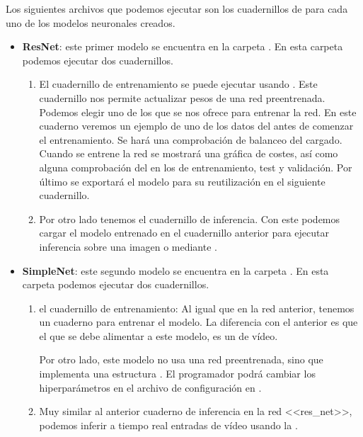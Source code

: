 Los siguientes archivos que podemos ejecutar son los cuadernillos de  para cada uno de los modelos neuronales creados.

\begin{itemize}
  \item \textbf{ResNet}: este primer modelo se encuentra en la carpeta . En esta carpeta podemos ejecutar dos cuadernillos.

        \begin{enumerate}
          \item El cuadernillo de entrenamiento se puede ejecutar usando . Este cuadernillo nos permite actualizar pesos de una red preentrenada. Podemos elegir uno de los  que se nos ofrece para entrenar la red. En este cuaderno veremos un ejemplo de uno de los datos del  antes de comenzar el entrenamiento. Se hará una comprobación de balanceo del  cargado. Cuando se entrene la red se mostrará una gráfica de costes, así como alguna comprobación del  en los  de entrenamiento, test y validación. Por último se exportará el modelo para su reutilización en el siguiente cuadernillo.

          \item Por otro lado tenemos el cuadernillo de inferencia. Con este podemos cargar el modelo entrenado en el cuadernillo anterior para ejecutar inferencia sobre una imagen o mediante .
        \end{enumerate}

  \item \textbf{SimpleNet}: este segundo modelo se encuentra en la carpeta . En esta carpeta podemos ejecutar dos cuadernillos.

        \begin{enumerate}
          \item el cuadernillo de entrenamiento: Al igual que en la red anterior, tenemos un cuaderno para entrenar el modelo. La diferencia con el anterior es que el  que se debe alimentar a este modelo, es un  de vídeo.

                Por otro lado, este modelo no usa una red preentrenada, sino que implementa una estructura . El programador podrá cambiar los hiperparámetros en el archivo de configuración en .

          \item Muy similar al anterior cuaderno de inferencia en la red <<res\_net>>, podemos inferir a tiempo real entradas de vídeo usando la .
        \end{enumerate}


\end{itemize}
